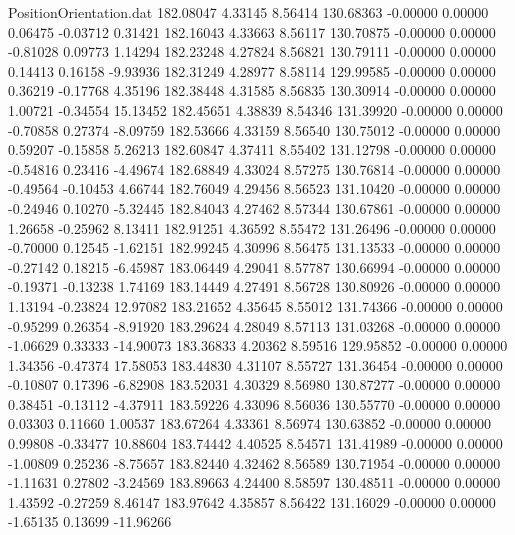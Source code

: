 \begin{filecontents}{PositionOrientation.dat}
 182.08047    4.33145    8.56414   130.68363   -0.00000    0.00000    0.06475   -0.03712    0.31421
 182.16043    4.33663    8.56117   130.70875   -0.00000    0.00000   -0.81028    0.09773    1.14294
 182.23248    4.27824    8.56821   130.79111   -0.00000    0.00000    0.14413    0.16158   -9.93936
 182.31249    4.28977    8.58114   129.99585   -0.00000    0.00000    0.36219   -0.17768    4.35196
 182.38448    4.31585    8.56835   130.30914   -0.00000    0.00000    1.00721   -0.34554   15.13452
 182.45651    4.38839    8.54346   131.39920   -0.00000    0.00000   -0.70858    0.27374   -8.09759
 182.53666    4.33159    8.56540   130.75012   -0.00000    0.00000    0.59207   -0.15858    5.26213
 182.60847    4.37411    8.55402   131.12798   -0.00000    0.00000   -0.54816    0.23416   -4.49674
 182.68849    4.33024    8.57275   130.76814   -0.00000    0.00000   -0.49564   -0.10453    4.66744
 182.76049    4.29456    8.56523   131.10420   -0.00000    0.00000   -0.24946    0.10270   -5.32445
 182.84043    4.27462    8.57344   130.67861   -0.00000    0.00000    1.26658   -0.25962    8.13411
 182.91251    4.36592    8.55472   131.26496   -0.00000    0.00000   -0.70000    0.12545   -1.62151
 182.99245    4.30996    8.56475   131.13533   -0.00000    0.00000   -0.27142    0.18215   -6.45987
 183.06449    4.29041    8.57787   130.66994   -0.00000    0.00000   -0.19371   -0.13238    1.74169
 183.14449    4.27491    8.56728   130.80926   -0.00000    0.00000    1.13194   -0.23824   12.97082
 183.21652    4.35645    8.55012   131.74366   -0.00000    0.00000   -0.95299    0.26354   -8.91920
 183.29624    4.28049    8.57113   131.03268   -0.00000    0.00000   -1.06629    0.33333  -14.90073
 183.36833    4.20362    8.59516   129.95852   -0.00000    0.00000    1.34356   -0.47374   17.58053
 183.44830    4.31107    8.55727   131.36454   -0.00000    0.00000   -0.10807    0.17396   -6.82908
 183.52031    4.30329    8.56980   130.87277   -0.00000    0.00000    0.38451   -0.13112   -4.37911
 183.59226    4.33096    8.56036   130.55770   -0.00000    0.00000    0.03303    0.11660    1.00537
 183.67264    4.33361    8.56974   130.63852   -0.00000    0.00000    0.99808   -0.33477   10.88604
 183.74442    4.40525    8.54571   131.41989   -0.00000    0.00000   -1.00809    0.25236   -8.75657
 183.82440    4.32462    8.56589   130.71954   -0.00000    0.00000   -1.11631    0.27802   -3.24569
 183.89663    4.24400    8.58597   130.48511   -0.00000    0.00000    1.43592   -0.27259    8.46147
 183.97642    4.35857    8.56422   131.16029   -0.00000    0.00000   -1.65135    0.13699  -11.96266

\end{filecontents}

